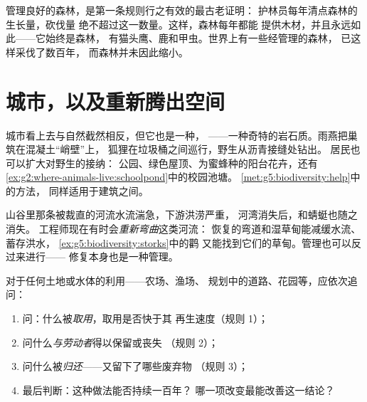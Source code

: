 \begin{example}[护林员的算账]\label{ex:g5:people-and-nature:forester}
管理良好的森林，是第一条规则行之有效的最古老证明：
护林员每年清点森林的生长量，砍伐量
绝不超过这一数量。这样，森林每年都能
提供木材，并且永远如此——它始终是森林，
有猫头鹰、鹿和甲虫。世界上有一些经管理的森林，
已这样采伐了数百年，
而森林并未因此缩小。
\end{example}

\section{城市，以及重新腾出空间}

\begin{example}[城镇中的自然]\label{ex:g5:people-and-nature:city}
城市看上去与自然截然相反，但它也是一种，
——一种奇特的岩石质。雨燕把巢筑在混凝土“峭壁”上，
狐狸在垃圾桶之间巡行，野生从沥青接缝处钻出。
居民也可以扩大对野生的接纳：
公园、绿色屋顶、为蜜蜂种的阳台花卉，还有
\cref{ex:g2:where-animals-live:schoolpond}中的校园池塘。
\cref{met:g5:biodiversity:help}中的方法，
同样适用于建筑之间。
\end{example}

\begin{example}[让河流重获河湾]\label{ex:g5:people-and-nature:river}
山谷里那条被裁直的河流水流湍急，下游洪涝严重，
河湾消失后，和蜻蜓也随之消失。
工程师现在有时会\emph{重新弯曲}这类河流：
恢复的弯道和湿草甸能减缓水流、蓄存洪水，
\cref{ex:g5:biodiversity:storks}中的鹳
又能找到它们的草甸。管理也可以反过来进行——
修复本身也是一种管理。
\end{example}

\begin{method}[判断对自然的利用]\label{met:g5:people-and-nature:judge}
对于任何土地或水体的利用——农场、渔场、
规划中的道路、花园等，应依次追问：
\begin{enumerate}
  \item 问：什么被\emph{取用}，取用是否快于其
        再生速度（规则 1）；
  \item 问什么\emph{与劳动者}得以保留或丧失
        （规则 2）；
  \item 问什么被\emph{归还}——又留下了哪些废弃物
        （规则 3）；
  \item 最后判断：这种做法能否持续一百年？
        哪一项改变最能改善这一结论？
\end{enumerate}
\end{method}

